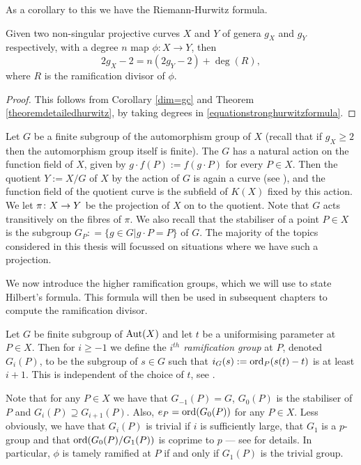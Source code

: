 As a corollary to this we have the Riemann-Hurwitz formula.
    \begin{cor}\label{corhurwitzformula}
    Given two non-singular projective curves $X$ and $Y$ of genera $g_X$ and $g_Y$ respectively, with a degree $n$ map $\phi\colon X \rightarrow Y$, then
        \[
        2g_X - 2 = n(2g_Y -2) + \deg(R),
        \]
    where $R$ is the ramification divisor of $\phi$.
    \end{cor}
    \begin{proof}
    This follows from Corollary \ref{dim=gc} and Theorem \ref{theoremdetailedhurwitz}, by taking degrees in \eqref{equationstronghurwitzformula}.
    \end{proof}

Let $G$ be a finite subgroup of the automorphism group of $X$ (recall that if $g_X \geq 2$ then the automorphism group itself is finite).
The $G$ has a natural action on the function field of $X$, given by $g\cdot f(P) := f(g \cdot P)$ for every $P \in X$.
Then the quotient $Y := X/G$ of $X$ by the action of $G$ is again a curve (see \cite[Pgs. 126-7]{griffithsfirstcourse}), and the function field of the quotient curve is the subfield of $K(X)$ fixed by this action.
We let $\pi \colon X \rightarrow Y$ be the projection of $X$ on to the quotient.
Note that $G$ acts transitively on the fibres of $\pi$.
We also recall that the stabiliser of a point $P \in X$ is the subgroup $G_P : = \{ g \in G | g \cdot P = P\}$ of $G$.
The majority of the topics considered in this thesis will focussed on situations where we have such a projection.

We now introduce the higher ramification groups, which we will use to state Hilbert's formula. 
This formula will then be used in subsequent chapters to compute the ramification divisor.

   \begin{defn}
    Let $G$ be finite subgroup of $\operatorname{Aut}(X)$ and let $t$ be a uniformising parameter at $P\in X$.
    Then for $i\geq -1$ we define the \emph{$i^{th}$ ramification group} at $P$, denoted $G_i(P)$, to be the subgroup of $s\in G$ such that $i_G(s) := \operatorname{ord}_P(s(t)-t)$ is at least $i+1$.
    This is	independent of the choice of $t$, see \cite[Chap. IV, \S 1, pg. 62]{localfields}.
    \end{defn}

Note that for any $P\in X$ we have that $G_{-1}(P)=G$, $G_0(P)$ is the stabiliser of $P$ and $G_i(P)\supseteq G_{i+1}(P)$.
Also, $e_P = \operatorname{ord} (G_0(P))$ for any $P \in X$.
Less obviously, we have that $G_i(P)$ is trivial if $i$ is sufficiently large, that $G_1$ is a $p$-group and that $\operatorname{ord}(G_0(P)/G_1(P))$ is coprime to $p$ ---  see \cite[Chap. IV, \S 1]{localfields} for details.
In particular, $\phi$ is tamely ramified at $P$ if and only if $G_1(P)$ is the trivial group.



